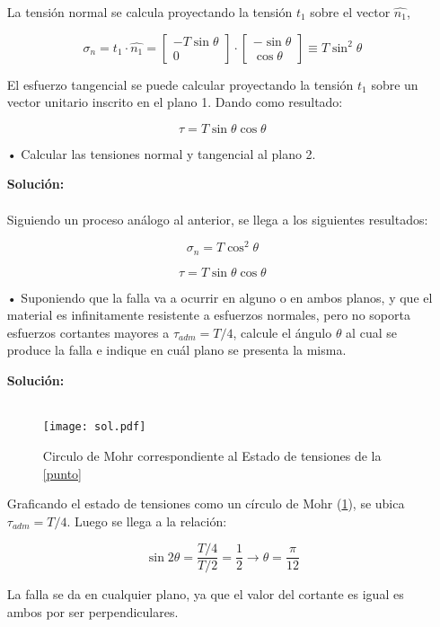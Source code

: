 \documentclass[../notas medios.tex]{subfiles}
\begin{document}
\begin{itemize}
La tensión normal se calcula proyectando la tensión $t_1$ sobre el vector $\hat{n_1}$, 

\begin{equation*}
\sigma_n = 
t_1 \cdot \hat{n_1} = 
\begin{bmatrix}
    -T\sin{\theta} \\
    0 
\end{bmatrix} \cdot
\begin{bmatrix}
    -\sin{\theta} \\
    \cos{\theta} 
\end{bmatrix} \equiv
T\sin^2\theta
\end{equation*}

El esfuerzo tangencial se puede calcular proyectando la tensión $t_1$ sobre un vector unitario inscrito en el plano 1. Dando como resultado:

\begin{equation*}
\tau = T\sin{\theta}\cos{\theta} 
\end{equation*}

\item[•] Calcular las tensiones normal y tangencial al plano 2.

\textbf{Solución:}\\\\

Siguiendo un proceso análogo al anterior, se llega a los siguientes resultados:

\begin{equation*}
\sigma_n = T\cos^2\theta 
\end{equation*}

\begin{equation*}
\tau = T\sin{\theta}\cos{\theta}
\end{equation*}

\item[•] Suponiendo que la falla va a ocurrir en alguno o en ambos planos, y que el material es infinitamente resistente a esfuerzos normales, pero no soporta esfuerzos cortantes mayores a $\tau_{adm} = T/4$, calcule el ángulo $\theta$ al cual se produce la falla e indique en cuál plano se presenta la misma. 

\textbf{Solución:}\\\\

\begin{figure}[h]
	\centering
	\texttt{[image: sol.pdf]} 
	\caption{Circulo de Mohr correspondiente al Estado de tensiones de la \cref{punto}}
	\label{sol}
\end{figure}

Graficando el estado de tensiones como un círculo de Mohr (\cref{sol}), se ubica $\tau_{adm} = T/4$. Luego se llega a la relación:

\begin{equation*}
\sin{2\theta} = \frac{T/4}{T/2} = \frac{1}{2} \rightarrow
\theta = \frac{\pi}{12}
\end{equation*}

La falla se da en cualquier plano, ya que el valor del cortante es igual es ambos por ser perpendiculares.

\end{itemize}
\end{document}
